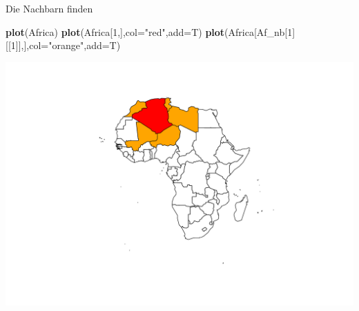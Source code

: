 \documentclass[ignorenonframetext,]{beamer}
\newenvironment{Shaded}{\begin{snugshade}}{\end{snugshade}}
\newcommand{\KeywordTok}[1]{\textcolor[rgb]{0.13,0.29,0.53}{\textbf{#1}}}
\newcommand{\DataTypeTok}[1]{\textcolor[rgb]{0.13,0.29,0.53}{#1}}
\newcommand{\DecValTok}[1]{\textcolor[rgb]{0.00,0.00,0.81}{#1}}
\newcommand{\StringTok}[1]{\textcolor[rgb]{0.31,0.60,0.02}{#1}}
\newcommand{\NormalTok}[1]{#1}
\begin{document}
\begin{frame}[fragile]{Die Nachbarn finden}

\begin{Shaded}
\begin{Highlighting}[]
\KeywordTok{plot}\NormalTok{(Africa)}
\KeywordTok{plot}\NormalTok{(Africa[}\DecValTok{1}\NormalTok{,],}\DataTypeTok{col=}\StringTok{"red"}\NormalTok{,}\DataTypeTok{add=}\NormalTok{T)}
\KeywordTok{plot}\NormalTok{(Africa[Af_nb[}\DecValTok{1}\NormalTok{][[}\DecValTok{1}\NormalTok{]],],}\DataTypeTok{col=}\StringTok{"orange"}\NormalTok{,}\DataTypeTok{add=}\NormalTok{T)}
\end{Highlighting}
\end{Shaded}

\includegraphics{spdep_files/figure-beamer/unnamed-chunk-12-1.pdf}

\end{frame}
\end{document}
